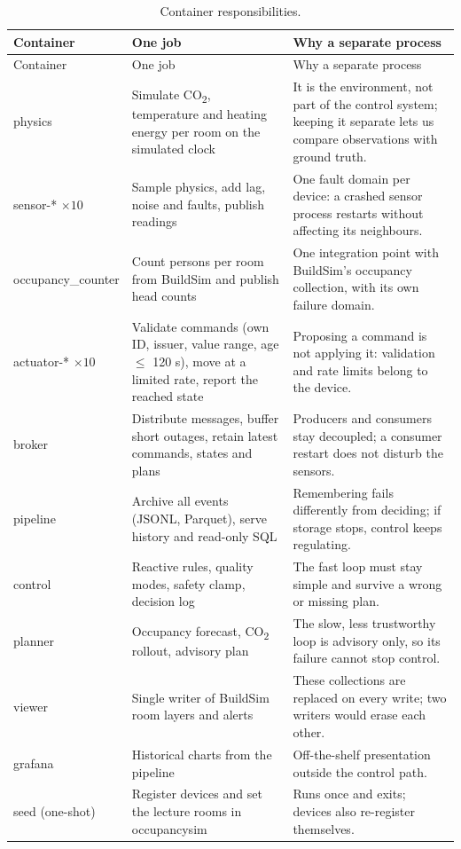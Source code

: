 \documentclass[11pt,a4paper]{article}
\begin{document}
{\small\begin{longtable}{>{\raggedright\arraybackslash}p{27mm}>{\raggedright\arraybackslash}p{52mm}>{\raggedright\arraybackslash}p{61mm}}
\caption{Container responsibilities.}\label{tab:resp}\\
\toprule Container & One job & Why a separate process\\\midrule\endfirsthead
\toprule Container & One job & Why a separate process\\\midrule\endhead
physics & Simulate CO\textsubscript{2}, temperature and heating energy per room on the simulated clock & It is the environment, not part of the control system; keeping it separate lets us compare observations with ground truth.\\
sensor-* $\times10$ & Sample physics, add lag, noise and faults, publish readings & One fault domain per device: a crashed sensor process restarts without affecting its neighbours.\\
occupancy\_\allowbreak counter & Count persons per room from BuildSim and publish head counts & One integration point with BuildSim's occupancy collection, with its own failure domain.\\
actuator-* $\times10$ & Validate commands (own ID, issuer, value range, age $\leq$ 120 s), move at a limited rate, report the reached state & Proposing a command is not applying it: validation and rate limits belong to the device.\\
broker & Distribute messages, buffer short outages, retain latest commands, states and plans & Producers and consumers stay decoupled; a consumer restart does not disturb the sensors.\\
pipeline & Archive all events (JSONL, Parquet), serve history and read-only SQL & Remembering fails differently from deciding; if storage stops, control keeps regulating.\\
control & Reactive rules, quality modes, safety clamp, decision log & The fast loop must stay simple and survive a wrong or missing plan.\\
planner & Occupancy forecast, CO\textsubscript{2} rollout, advisory plan & The slow, less trustworthy loop is advisory only, so its failure cannot stop control.\\
viewer & Single writer of BuildSim room layers and alerts & These collections are replaced on every write; two writers would erase each other.\\
grafana & Historical charts from the pipeline & Off-the-shelf presentation outside the control path.\\
seed (one-shot) & Register devices and set the lecture rooms in occupancysim & Runs once and exits; devices also re-register themselves.\\\bottomrule
\end{longtable}}
\end{document}
